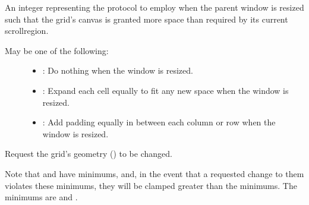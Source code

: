 \documentclass[letterpaper,10pt,english]{sphinxmanual}
\begin{document}
\begin{fulllineitems}
\begin{fulllineitems}
\begin{quote}
\begin{description}
\end{description}\end{quote}

\end{fulllineitems}


\begin{fulllineitems}
\label{\detokenize{api:gui.core.Grid.resize_protocol}}
An integer representing the protocol to employ when the parent window is resized such that the grid’s canvas is
granted more space than required by its current scrollregion.
\begin{description}
\item[{May be one of the following:}] \leavevmode\begin{itemize}
\item {} 
: Do nothing when the window is resized.

\item {} 
: Expand each cell equally to fit any new space when the window is            resized.

\item {} 
: Add padding equally in between each column or row when the window            is resized.

\end{itemize}

\end{description}

\end{fulllineitems}


\begin{fulllineitems}
\label{\detokenize{api:gui.core.Grid.set_geometry}}
Request the grid’s geometry () to be changed.

Note that  and  have minimums, and, in the event that a requested change to them
violates these minimums, they will be clamped greater than the minimums. The minimums are
 and .


\end{fulllineitems}
\end{fulllineitems}
\end{document}

